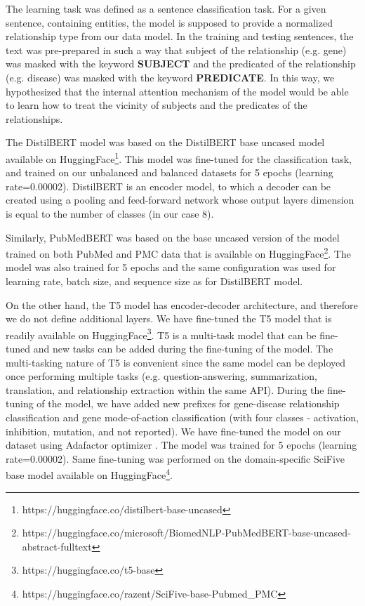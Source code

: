 \documentclass[final,12pt,3p,times,twocolumn,authoryear]{elsarticle}
\begin{document}
The learning task was defined as a sentence classification task. For a given sentence, containing entities, the model is supposed to provide a normalized relationship type from our data model. In the training and testing sentences, the text was pre-prepared in such a way that subject of the relationship (e.g. gene) was masked with the keyword \textbf{SUBJECT} and the predicated of the relationship (e.g. disease) was masked with the keyword \textbf{PREDICATE}. In this way, we hypothesized that the internal attention mechanism of the model would be able to learn how to treat the vicinity of subjects and the predicates of the relationships. 

The DistilBERT model was based on the DistilBERT base uncased model available on HuggingFace\footnote{https://huggingface.co/distilbert-base-uncased}. This model was fine-tuned for the classification task, and trained on our unbalanced and balanced datasets for 5 epochs (learning rate=0.00002). DistilBERT is an encoder model, to which a decoder can be created using a pooling and feed-forward network whose output layers dimension is equal to the number of classes (in our case 8).

Similarly, PubMedBERT was based on the base uncased version of the model trained on both PubMed and PMC data that is available on HuggingFace\footnote{https://huggingface.co/microsoft/BiomedNLP-PubMedBERT-base-uncased-abstract-fulltext}. The model was also trained for 5 epochs and the same configuration was used for learning rate, batch size, and sequence size as for DistilBERT model.

On the other hand, the T5 model has encoder-decoder architecture, and therefore we do not define additional layers. We have fine-tuned the T5 model that is readily available on HuggingFace\footnote{https://huggingface.co/t5-base}. T5 is a multi-task model that can be fine-tuned and new tasks can be added during the fine-tuning of the model. The multi-tasking nature of T5 is convenient since the same model can be deployed once performing multiple tasks (e.g. question-answering, summarization, translation, and relationship extraction within the same API). During the fine-tuning of the model, we have added new prefixes for gene-disease relationship classification and gene mode-of-action classification (with four classes - activation, inhibition, mutation, and not reported). We have fine-tuned the model on our dataset using Adafactor optimizer \citep{shazeer2018adafactor}. The model was trained for 5 epochs (learning rate=0.00002). Same fine-tuning was performed on the domain-specific SciFive base model available on HuggingFace\footnote{https://huggingface.co/razent/SciFive-base-Pubmed\_PMC}. 
\end{document}
